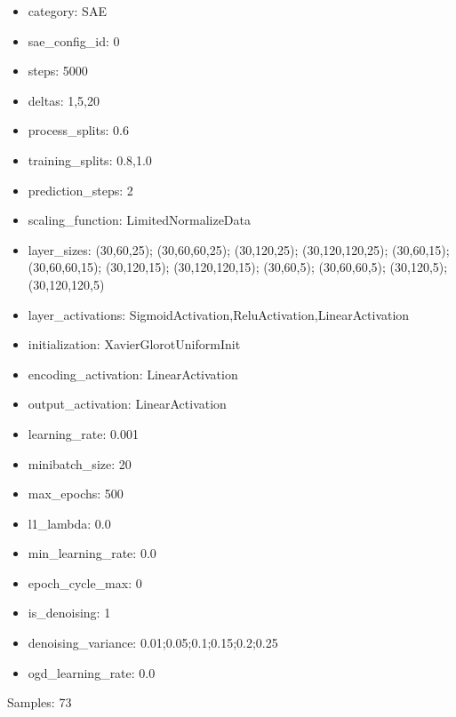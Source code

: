 \documentclass[a4paper,11pt,oneside]{article}
\theoremstyle{plain}
\theoremstyle{definition}
\begin{document}
	\begin{itemize}
		\item category: SAE
		\item sae\_config\_id: 0
		\item steps: 5000
		\item deltas: 1,5,20
		\item process\_splits: 0.6
		\item training\_splits: 0.8,1.0
		\item prediction\_steps: 2
		\item scaling\_function: LimitedNormalizeData
		\item layer\_sizes: (30,60,25); (30,60,60,25); (30,120,25); (30,120,120,25); (30,60,15); (30,60,60,15); (30,120,15); (30,120,120,15); (30,60,5); (30,60,60,5); (30,120,5); (30,120,120,5)
		\item layer\_activations: SigmoidActivation,ReluActivation,LinearActivation
		\item initialization: XavierGlorotUniformInit
		\item encoding\_activation: LinearActivation
		\item output\_activation: LinearActivation
		\item learning\_rate: 0.001
		\item minibatch\_size: 20
		\item max\_epochs: 500
		\item l1\_lambda: 0.0
		\item min\_learning\_rate: 0.0
		\item epoch\_cycle\_max: 0
		\item is\_denoising: 1
		\item denoising\_variance: 0.01;0.05;0.1;0.15;0.2;0.25
		\item ogd\_learning\_rate: 0.0
	\end{itemize}
	
	Samples: 73
	
\end{document}
